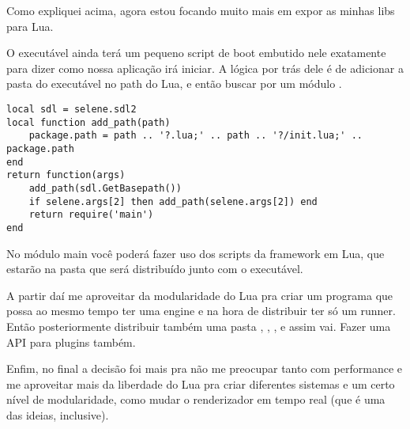 \documentclass[a4paper,oneside,12pt]{article}
\begin{document}
Como expliquei acima, agora estou focando muito mais em expor as minhas libs para Lua.

O executável ainda terá um pequeno script de boot embutido nele exatamente para dizer como nossa aplicação irá iniciar. A lógica por trás dele é de adicionar a pasta do executável no path do Lua, e então buscar por um módulo .

\begin{lstlisting}[language={[5.2]Lua}]
local sdl = selene.sdl2
local function add_path(path)
    package.path = path .. '?.lua;' .. path .. '?/init.lua;' .. package.path
end
return function(args)
    add_path(sdl.GetBasepath())
    if selene.args[2] then add_path(selene.args[2]) end
    return require('main')
end
\end{lstlisting}

No módulo main você poderá fazer uso dos scripts da framework em Lua, que estarão na pasta  que será distribuído junto com o executável.

A partir daí me aproveitar da modularidade do Lua pra criar um programa que possa ao mesmo tempo ter uma engine e na hora de distribuir ter só um runner. Então posteriormente distribuir também uma pasta , , , e assim vai. Fazer uma API para plugins também.

Enfim, no final a decisão foi mais pra não me preocupar tanto com performance e me aproveitar mais da liberdade do Lua pra criar diferentes sistemas e um certo nível de modularidade, como mudar o renderizador em tempo real (que é uma das ideias, inclusive).
\end{document}
